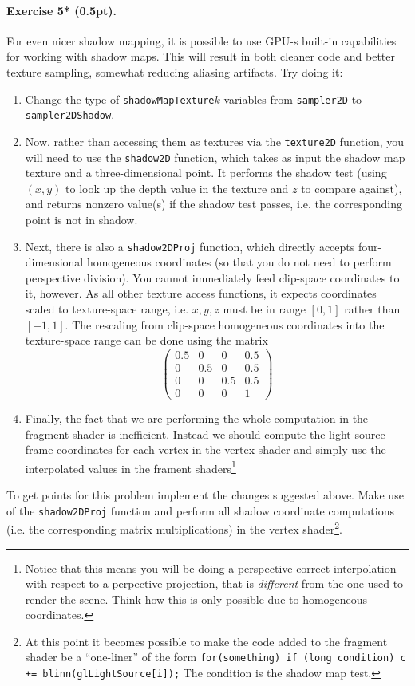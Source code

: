 \documentclass{article}
\newenvironment{exercise}[2]{\paragraph{Exercise #1 (#2pt).} }{
\medskip}
\begin{document}
\begin{exercise}{5*}{0.5}
For even nicer shadow mapping, it is possible to use GPU-s built-in capabilities for working with shadow maps. This will result in both cleaner code and better texture sampling, somewhat reducing aliasing artifacts. Try doing it:
\begin{enumerate}
\item Change the type of \texttt{shadowMapTexture}$k$ variables from \texttt{sampler2D} to \texttt{sampler2DShadow}.
\item Now, rather than accessing them as textures via the \texttt{texture2D} function, you will need to use the \texttt{shadow2D} function, which takes as input the shadow map texture and a three-dimensional point. It performs the shadow test (using $(x, y)$ to look up the depth value in the texture and $z$ to compare against), and returns nonzero value(s) if the shadow test passes, i.e. the corresponding point is not in shadow.
\item Next, there is also a \texttt{shadow2DProj} function, which directly accepts four-dimensional homogeneous coordinates (so that you do not need to perform perspective division). You cannot immediately feed clip-space coordinates to it, however. As all other texture access functions, it expects coordinates scaled to texture-space range, i.e. $x, y, z$ must be in range $[0, 1]$ rather than $[-1, 1]$. The rescaling from clip-space homogeneous coordinates into the texture-space range can be done using the matrix
$$
\left(\begin{matrix}0.5 & 0 & 0 & 0.5\\
0 & 0.5 & 0 & 0.5 \\
0 & 0 & 0.5 & 0.5 \\
0 & 0& 0& 1\end{matrix}\right)
$$
\item Finally, the fact that we are performing the whole computation in the fragment shader is inefficient. Instead we should compute the light-source-frame coordinates for each vertex in the vertex shader and simply use the interpolated values in the frament shaders\footnote{Notice that this means you will be doing a perspective-correct interpolation with respect to a perpective projection, that is \emph{different} from the one used to render the scene. Think how this is only possible due to homogeneous coordinates.}
\end{enumerate}
To get points for this problem implement the changes suggested above. Make use of the \texttt{shadow2DProj} function and perform all shadow coordinate computations (i.e. the corresponding matrix multiplications) in the vertex shader\footnote{At this point it becomes possible to make the code added to the fragment shader be a ``one-liner'' of the form \texttt{for(something) if (long condition) c += blinn(gl\textunderscore LightSource[i]);} The condition is the shadow map test.}.
\end{exercise}
\end{document}
